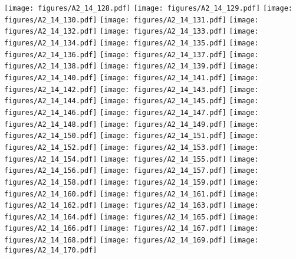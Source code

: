 \documentclass[12pt,a4paper]{article}
\begin{document}
\texttt{[image: figures/A2\_14\_128.pdf]}
\texttt{[image: figures/A2\_14\_129.pdf]}
\texttt{[image: figures/A2\_14\_130.pdf]}
\texttt{[image: figures/A2\_14\_131.pdf]}
\texttt{[image: figures/A2\_14\_132.pdf]}
\texttt{[image: figures/A2\_14\_133.pdf]}
\texttt{[image: figures/A2\_14\_134.pdf]}
\texttt{[image: figures/A2\_14\_135.pdf]}
\texttt{[image: figures/A2\_14\_136.pdf]}
\texttt{[image: figures/A2\_14\_137.pdf]}
\texttt{[image: figures/A2\_14\_138.pdf]}
\texttt{[image: figures/A2\_14\_139.pdf]}
\texttt{[image: figures/A2\_14\_140.pdf]}
\texttt{[image: figures/A2\_14\_141.pdf]}
\texttt{[image: figures/A2\_14\_142.pdf]}
\texttt{[image: figures/A2\_14\_143.pdf]}
\texttt{[image: figures/A2\_14\_144.pdf]}
\texttt{[image: figures/A2\_14\_145.pdf]}
\texttt{[image: figures/A2\_14\_146.pdf]}
\texttt{[image: figures/A2\_14\_147.pdf]}
\texttt{[image: figures/A2\_14\_148.pdf]}
\texttt{[image: figures/A2\_14\_149.pdf]}
\texttt{[image: figures/A2\_14\_150.pdf]}
\texttt{[image: figures/A2\_14\_151.pdf]}
\texttt{[image: figures/A2\_14\_152.pdf]}
\texttt{[image: figures/A2\_14\_153.pdf]}
\texttt{[image: figures/A2\_14\_154.pdf]}
\texttt{[image: figures/A2\_14\_155.pdf]}
\texttt{[image: figures/A2\_14\_156.pdf]}
\texttt{[image: figures/A2\_14\_157.pdf]}
\texttt{[image: figures/A2\_14\_158.pdf]}
\texttt{[image: figures/A2\_14\_159.pdf]}
\texttt{[image: figures/A2\_14\_160.pdf]}
\texttt{[image: figures/A2\_14\_161.pdf]}
\texttt{[image: figures/A2\_14\_162.pdf]}
\texttt{[image: figures/A2\_14\_163.pdf]}
\texttt{[image: figures/A2\_14\_164.pdf]}
\texttt{[image: figures/A2\_14\_165.pdf]}
\texttt{[image: figures/A2\_14\_166.pdf]}
\texttt{[image: figures/A2\_14\_167.pdf]}
\texttt{[image: figures/A2\_14\_168.pdf]}
\texttt{[image: figures/A2\_14\_169.pdf]}
\texttt{[image: figures/A2\_14\_170.pdf]}
\end{document}
